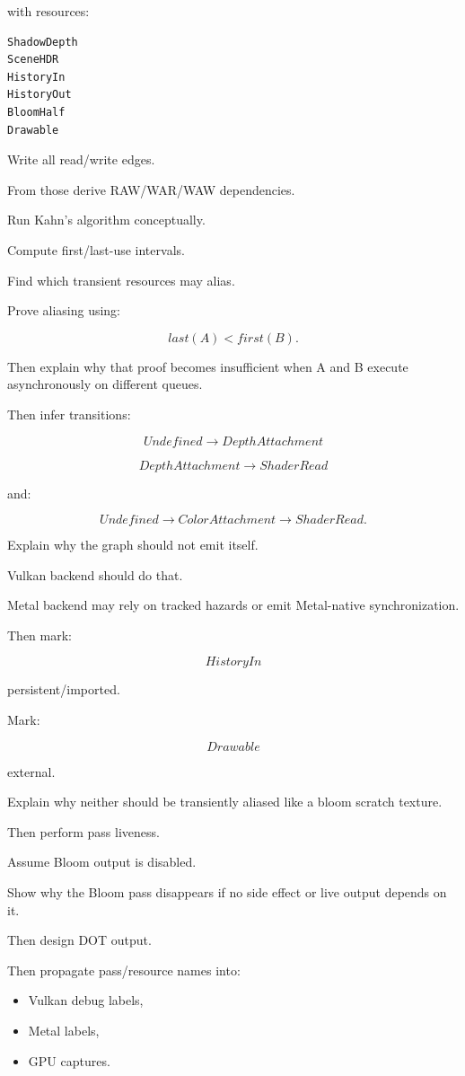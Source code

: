 with resources:

\begin{verbatim}
ShadowDepth
SceneHDR
HistoryIn
HistoryOut
BloomHalf
Drawable
\end{verbatim}

Write all read/write edges.

From those derive RAW/WAR/WAW dependencies.

Run Kahn's algorithm conceptually.

Compute first/last-use intervals.

Find which transient resources may alias.

Prove aliasing using:

\[
last(A)<first(B).
\]

Then explain why that proof becomes insufficient when A and B execute asynchronously on different queues.

Then infer transitions:

\[
Undefined
\rightarrow
DepthAttachment
\]

\[
DepthAttachment
\rightarrow
ShaderRead
\]

and:

\[
Undefined
\rightarrow
ColorAttachment
\rightarrow
ShaderRead.
\]

Explain why the graph should not emit  itself.

Vulkan backend should do that.

Metal backend may rely on tracked hazards or emit Metal-native synchronization.

Then mark:

\[
HistoryIn
\]

persistent/imported.

Mark:

\[
Drawable
\]

external.

Explain why neither should be transiently aliased like a bloom scratch texture.

Then perform pass liveness.

Assume Bloom output is disabled.

Show why the Bloom pass disappears if no side effect or live output depends on it.

Then design DOT output.

Then propagate pass/resource names into:

\begin{itemize}
\tightlist
\item
  Vulkan debug labels,
\item
  Metal labels,
\item
  GPU captures.
\end{itemize}

